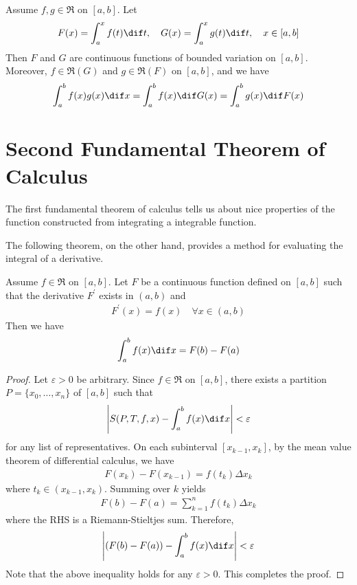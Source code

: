 \documentclass[thmcnt=section, color=blue, 12pt]{my-elegantbook}
\begin{document}
\begin{theorem} \label{thm:23}
	Assume $f, g \in \mathfrak{R}$ on $[a, b]$.
	Let
	\begin{align*}
		F(x) = \int_a^x f(t) \dif t, \quad
		G(x) = \int_a^x g(t) \dif t, \quad
		x \in [a, b]
	\end{align*}
	Then $F$ and $G$ are continuous functions of bounded variation on $[a, b]$.
	Moreover, $f \in \mathfrak{R}(G)$ and $g \in \mathfrak{R}(F)$ on $[a, b]$,
	and we have
	\begin{align*}
		\int_a^b f(x) g(x) \dif x
		= \int_a^b f(x) \dif G(x)
		= \int_a^b g(x) \dif F(x)
	\end{align*}
\end{theorem}



\section{Second Fundamental Theorem of Calculus}

The first fundamental theorem of calculus
tells us about nice properties of the function
constructed from integrating a integrable function.

The following theorem, on the other hand, provides a method for evaluating the integral of a derivative.

\begin{theorem} \label{thm:22}
	Assume $f \in \mathfrak{R}$ on $[a, b]$.
	Let $F$ be a continuous function defined on $[a, b]$
	such that the derivative $F^\prime$ exists in $(a, b)$ and
	\begin{align*}
		F^\prime(x) = f(x) \quad \forall x \in (a, b)
	\end{align*}
	Then we have
	\begin{align*}
		\int_a^b f(x) \dif x
		= F(b) - F(a)
	\end{align*}
\end{theorem}

\begin{proof}
	Let $\varepsilon > 0$ be arbitrary.
	Since $f \in \mathfrak{R}$ on $[a, b]$,
	there exists a partition $P = \{x_0, \ldots, x_n\}$ of $[a, b]$ such that
	\begin{align*}
		\abs{S(P,T,f,x) - \int_a^b f(x) \dif x} < \varepsilon
	\end{align*}
	for any list of representatives.
	On each subinterval $[x_{k-1}, x_k]$,
	by the mean value theorem of differential calculus,
	we have
	\begin{align*}
		F(x_k) - F(x_{k-1}) = f(t_k) \Delta x_k
	\end{align*}
	where $t_k \in (x_{k-1}, x_k)$.
	Summing over $k$ yields
	\begin{align*}
		F(b) - F(a)
		= \sum_{k=1}^n f(t_k) \Delta x_k
	\end{align*}
	where the RHS is a Riemann-Stieltjes sum.
	Therefore,
	\begin{align*}
		\abs{(F(b) - F(a)) - \int_a^b f(x) \dif x} < \varepsilon
	\end{align*}
	Note that the above inequality holds for any $\varepsilon > 0$.
	This completes the proof.
\end{proof}
\end{document}
